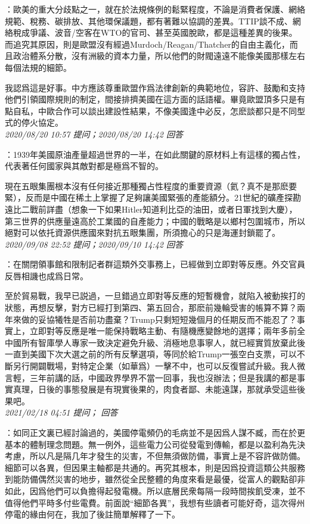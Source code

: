 \documentclass[twocolumn]{ctexart}
\begin{document}
：歐美的重大分歧點之一，就在於法規條例的鬆緊程度，不論是消費者保護、網絡規範、稅務、碳排放、其他環保議題，都有著難以協調的差異。TTIP談不成、網絡稅成爭議、波音/空客在WTO的官司、甚至英國脫歐，都是這種差異的後果。而追究其原因，則是歐盟沒有經過Murdoch/Reagan/Thatcher的自由主義化，而且政治體系分散，沒有洲級的資本力量，所以他們的財閥遠遠不能像美國那樣左右每個法規的細節。

我認爲這是好事。中方應該尊重歐盟作爲法律創新的典範地位，容許、鼓勵和支持他們引領國際規則的制定，間接排擠美國在這方面的話語權。畢竟歐盟頂多只是有點自私，中歐合作可以談出建設性結果，不像美國逢中必反，怎麽談都只是不同型式的停火協定。
\\

\textit{\hfill\noindent\small 2020/08/20 10:57 提问；2020/08/20 14:42 回答}

：1939年美國原油產量超過世界的一半，在如此關鍵的原材料上有這樣的獨占性，代表著任何國家與其敵對都是極爲不智的。

現在五眼集團根本沒有任何接近那種獨占性程度的重要資源（氦？真不是那麽要緊），反而是中國在稀土上掌握了足夠讓美國緊張的產能額分。21世紀的礦產探勘遠比二戰前詳盡（想象一下如果Hitler知道利比亞的油田，或者日軍找到大慶），第三世界的供應量遠高於工業國的自產能力；中國的戰略是以鄉村包圍城市，所以絕對可以依托資源供應國來對抗五眼集團，所須擔心的只是海運封鎖罷了。
\\

\textit{\hfill\noindent\small 2020/09/08 22:52 提问；2020/09/10 14:42 回答}

：在關閉領事館和限制記者群這類外交事務上，已經做到立即對等反應。外交官員反唇相譏也成爲日常。

至於貿易戰，我早已説過，一旦錯過立即對等反應的短暫機會，就陷入被動挨打的狀態，再想反擊，對方已經打到第四、第五回合，那麽前幾輪受害的帳算不算？兩年來做的妥協犧牲是否前功盡棄？Trump只剩短短幾個月的任期反而不能忍了？事實上，立即對等反應是唯一能保持戰略主動、有隨機應變餘地的選擇；兩年多前全中國所有智庫學人專家一致決定避免升級、消極地息事寧人，就已經實質放棄此後一直到美國下次大選之前的所有反擊選項，等同於給Trump一張空白支票，可以不斷另行開闢戰場，對特定企業（如華爲）一擊不中，也可以反復嘗試升級。我人微言輕，三年前講的話，中國政界學界不當一回事，我也沒辦法；但是我講的都是事實真理，日後的事態發展是有現實後果的，肉食者鄙、未能遠謀，那就承受這些後果吧。
\\

\textit{\hfill\noindent\small 2021/02/18 04:51 提问； 回答}

：如同正文裏已經討論過的，美國停電頻仍的毛病並不是因爲人謀不臧，而在於更基本的體制理念問題。無一例外，這些電力公司從發電到傳輸，都是以盈利為先決考慮，所以凡是隔几年才發生的災害，不但無須做防備，事實上是不容許做防備。細節可以各異，但因果主軸都是共通的。再究其根本，則是因爲投資這類公共服務到能防備偶然災害的地步，雖然從全民整體的角度來看是最優，從富人的觀點卻非如此，因爲他們可以負擔得起發電機。所以底層民衆每隔一段時間挨飢受凍，並不值得他們平時多付些電費。前面說“細節各異”，我想有些讀者可能好奇，這次得州停電的緣由何在，我加了後註簡單解釋了一下。\\
\end{document}
